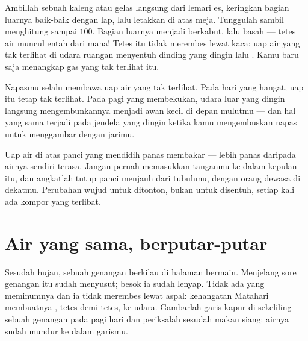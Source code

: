 \begin{example}\label{ex:g2:ice-water-steam:catch}
Ambillah sebuah kaleng atau gelas langsung dari lemari es, keringkan
bagian luarnya baik-baik dengan lap, lalu letakkan di atas meja.
Tunggulah sambil menghitung sampai $100$. Bagian luarnya menjadi
berkabut, lalu basah --- tetes air muncul entah dari mana! Tetes itu
tidak merembes lewat kaca: uap air yang tak terlihat di udara ruangan
menyentuh dinding yang dingin lalu . Kamu baru saja menangkap
gas yang tak terlihat itu.
\end{example}

\begin{example}\label{ex:g2:ice-water-steam:breath}
Napasmu selalu membawa uap air yang tak terlihat. Pada hari yang
hangat, uap itu tetap tak terlihat. Pada pagi yang membekukan, udara
luar yang dingin langsung mengembunkannya menjadi awan kecil di depan
mulutmu --- dan hal yang sama terjadi pada jendela yang dingin ketika
kamu mengembuskan napas untuk menggambar dengan jarimu.
\end{example}

\begin{remark}\label{rem:g2:ice-water-steam:safety}
Uap air di atas panci yang mendidih panas membakar --- lebih panas
daripada airnya sendiri terasa. Jangan pernah memasukkan tanganmu ke
dalam kepulan itu, dan angkatlah tutup panci menjauh dari tubuhmu,
dengan orang dewasa di dekatmu. Perubahan wujud untuk ditonton, bukan
untuk disentuh, setiap kali ada kompor yang terlibat.
\end{remark}

\section{Air yang sama, berputar-putar}

\begin{example}\label{ex:g2:ice-water-steam:puddle}
Sesudah hujan, sebuah genangan berkilau di halaman bermain. Menjelang
sore genangan itu sudah menyusut; besok ia sudah lenyap. Tidak ada
yang meminumnya dan ia tidak merembes lewat aspal: kehangatan Matahari
membuatnya , tetes demi tetes, ke udara. Gambarlah garis kapur
di sekeliling sebuah genangan pada pagi hari dan periksalah sesudah
makan siang: airnya sudah mundur ke dalam garismu.
\end{example}

